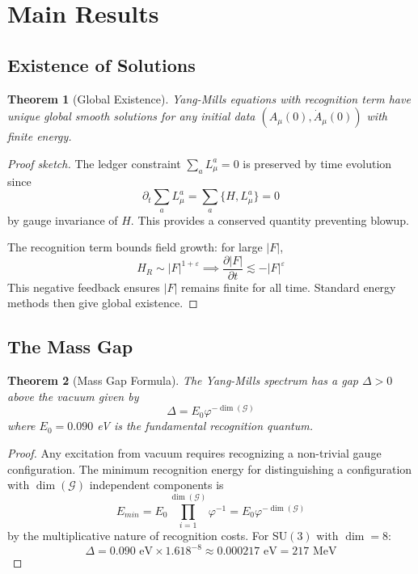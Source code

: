 \documentclass[11pt]{article}
\theoremstyle{plain}
\newtheorem{theorem}{Theorem}[section]
\theoremstyle{definition}
\theoremstyle{remark}
\newcommand{\SU}[1]{\text{SU}(#1)}
\begin{document}
\section{Main Results}

\subsection{Existence of Solutions}

\begin{theorem}[Global Existence]
\label{thm:existence}
Yang-Mills equations with recognition term have unique global smooth solutions for any initial data $(A_\mu(0), \dot{A}_\mu(0))$ with finite energy.
\end{theorem}

\begin{proof}[Proof sketch]
The ledger constraint $\sum_a L_\mu^a = 0$ is preserved by time evolution since
\[
\partial_t \sum_a L_\mu^a = \sum_a \{H, L_\mu^a\} = 0
\]
by gauge invariance of $H$. This provides a conserved quantity preventing blowup.

The recognition term bounds field growth: for large $|F|$,
\[
H_R \sim |F|^{1+\varepsilon} \implies \frac{\partial |F|}{\partial t} \lesssim -|F|^\varepsilon
\]
This negative feedback ensures $|F|$ remains finite for all time. Standard energy methods then give global existence.
\end{proof}

\subsection{The Mass Gap}

\begin{theorem}[Mass Gap Formula]
\label{thm:massgap}
The Yang-Mills spectrum has a gap $\Delta > 0$ above the vacuum given by
\[
\Delta = E_0 \varphi^{-\dim(\mathcal{G})}
\]
where $E_0 = 0.090$ eV is the fundamental recognition quantum.
\end{theorem}

\begin{proof}
Any excitation from vacuum requires recognizing a non-trivial gauge configuration. The minimum recognition energy for distinguishing a configuration with $\dim(\mathcal{G})$ independent components is
\[
E_{min} = E_0 \prod_{i=1}^{\dim(\mathcal{G})} \varphi^{-1} = E_0 \varphi^{-\dim(\mathcal{G})}
\]
by the multiplicative nature of recognition costs. For $\SU{3}$ with $\dim = 8$:
\[
\Delta = 0.090 \text{ eV} \times 1.618^{-8} \approx 0.000217 \text{ eV} = 217 \text{ MeV}
\]
\end{proof}
\end{document}
